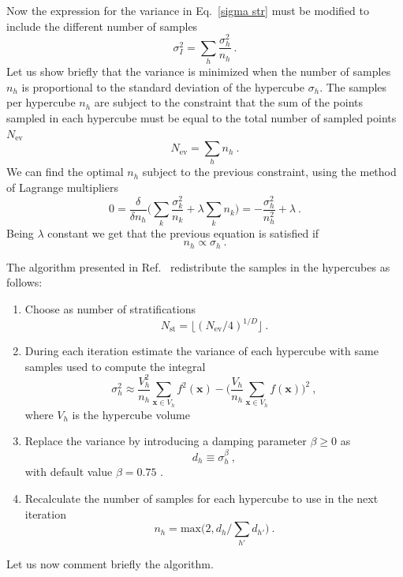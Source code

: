 \documentclass[../main/main.tex]{subfiles}
\begin{document}
Now the expression for the variance in Eq.~\ref{sigma str} must be modified to include the different number of samples
\begin{equation}
		\sigma^2_I = \sum_h  \frac{\sigma^2_h}{n_h} \ .
\end{equation}
Let us show briefly that the variance is minimized when the number of samples $n_h$ is proportional to the standard deviation of the hypercube 
$\sigma_h$.
The samples per hypercube $n_h$ are subject to the constraint that the sum of the points sampled in each hypercube  must be equal to the total number of sampled
points $N_\text{ev}$
\begin{equation}
	N_\text{ev} = \sum_h n_h \ .
\end{equation}
We can find the optimal $n_h$ subject to the previous constraint, using the method of Lagrange multipliers
\begin{equation}
	0 = \frac{\delta}{\delta n_h} \bigg( \sum_k \frac{\sigma^2_k}{n_k} + \lambda \sum_k n_k\bigg) =  - \frac{\sigma^2_h}{n^2_h} + \lambda \ .
\end{equation}
Being $\lambda$ constant we get that the previous equation is satisfied if
\begin{equation}
	n_h \propto \sigma_h \ .
\end{equation}

The algorithm presented in Ref.~\cite{Lepage:2020tgj} redistribute the samples in the hypercubes as follows:

\begin{enumerate}
\item Choose as number of stratifications
\begin{equation}
		\label{nstrat}
		N_\text{st} = \lfloor (N_\text{ev}/4)^{1/D}\rfloor  \ .
\end{equation}
\item During each iteration estimate the variance of each hypercube with same samples used to compute the integral
\begin{equation}
	\sigma^2_h \approx \frac{V_h^2}{n_h} \sum_{\textbf{x} \in V_h} f^2(\textbf{x}) - \bigg( \frac{V_h}{n_h} \sum_{\textbf{x} \in V_h} f(\textbf{x})\bigg)^2 \ ,
\end{equation}
where $V_h$ is the hypercube volume
\item Replace the variance by introducing a damping parameter $\beta \ge 0$ as
\begin{equation}
	d_h \equiv \sigma_h^\beta \ ,
\end{equation}
with default value $\beta = 0.75$ .
\item 
Recalculate the number of samples for each hypercube to use in the next iteration
\begin{equation}
	n_h = \text{max} \big(2, d_h / \sum_{h'} d_{h'}\big) \ .
\end{equation}
\end{enumerate}
Let us now comment briefly the algorithm.
\end{document}
